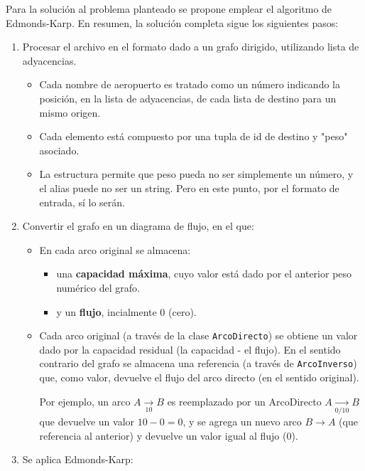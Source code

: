 \documentclass[../tp3_grupo404.tex]{subfiles}
\begin{document}
Para la solución al problema planteado se propone emplear el algoritmo de Edmonds-Karp.
En resumen, la solución completa sigue los siguientes pasos:
\begin{enumerate}
    \item Procesar el archivo en el formato dado a un grafo dirigido, utilizando lista de adyacencias.
    \begin{itemize}
        \item Cada nombre de aeropuerto es tratado como un número indicando la posición, en la lista
        de adyacencias, de cada lista de destino para un mismo origen.
        \item Cada elemento está compuesto por una tupla de id de destino y "peso" asociado.
        \item La estructura permite que peso pueda no ser simplemente un número, y el alias puede no ser un string.
            Pero en este punto, por el formato de entrada, sí lo serán.
    \end{itemize}
    \item Convertir el grafo en un diagrama de flujo, en el que:\begin{itemize}
        \item En cada arco original se almacena:\begin{itemize}
            \item una \textbf{capacidad máxima}, cuyo valor está dado por el anterior peso numérico del grafo.
            \item y un \textbf{flujo}, incialmente 0 (cero).
        \end{itemize}
        \item Cada arco original (a través de la clase \texttt{ArcoDirecto}) se obtiene un valor dado por
            la capacidad residual (la capacidad - el flujo). En el sentido contrario del grafo se almacena
            una referencia (a través de \texttt{ArcoInverso}) que, como valor, devuelve el flujo del arco
            directo (en el sentido original).
            \par Por ejemplo, un arco $A\underset{10}{\rightarrow}B$ es reemplazado por un ArcoDirecto
            $A\underset{0/10}{\rightarrow}B$ que devuelve un valor $10-0=0$, y se agrega un nuevo arco
            $B\rightarrow A$ (que referencia al anterior) y devuelve un valor igual al flujo ($0$).
    \end{itemize}
    \item Se aplica Edmonds-Karp: \begin{enumerate}

\end{enumerate}
\end{enumerate}
\end{document}
